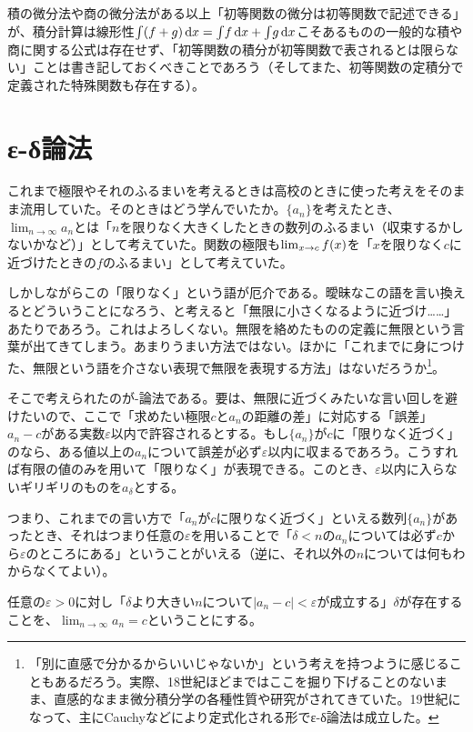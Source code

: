 積の微分法や商の微分法がある以上「初等関数の微分は初等関数で記述できる」が、積分計算は線形性$\int\pare{f+g}\,\dx=\int\!f\,\dx+\int\!g\,\dx$こそあるものの一般的な積や商に関する公式は存在せず、「初等関数の積分が初等関数で表されるとは限らない」ことは書き記しておくべきことであろう（そしてまた、初等関数の定積分で定義された特殊関数も存在する）。

\clearpage
\section{ε-δ論法}
これまで極限やそれのふるまいを考えるときは高校のときに使った考えをそのまま流用していた。そのときはどう学んでいたか。$\{a_n\}$を考えたとき、$\lim_{n\to\infty}a_n$とは「$n$を限りなく大きくしたときの数列のふるまい（収束するかしないかなど）」として考えていた。関数の極限も$\lim_{x\to c}f\pare{x}$を「$x$を限りなく$c$に近づけたときの$f$のふるまい」として考えていた。

しかしながらこの「限りなく」という語が厄介である。曖昧なこの語を言い換えるとどういうことになろう、と考えると「無限に小さくなるように近づけ……」あたりであろう。これはよろしくない。無限を絡めたものの定義に無限という言葉が出てきてしまう。あまりうまい方法ではない。ほかに「これまでに身につけた、無限という語を介さない表現で無限を表現する方法」はないだろうか\footnote{「別に直感で分かるからいいじゃないか」という考えを持つように感じることもあるだろう。実際、18世紀ほどまではここを掘り下げることのないまま、直感的なまま微分積分学の各種性質や研究がされてきていた。19世紀になって、主にCauchyなどにより定式化される形でε-δ論法は成立した。}。

そこで考えられたのが\textit{\varepsilon}-\textit{\delta}論法である。要は、無限に近づくみたいな言い回しを避けたいので、ここで「求めたい極限$c$と$a_n$の距離の差」に対応する「誤差」$a_n-c$がある実数$\varepsilon$以内で許容されるとする。もし$\{a_n\}$が$c$に「限りなく近づく」のなら、ある値以上の$a_n$について誤差が必ず$\varepsilon$以内に収まるであろう。こうすれば有限の値のみを用いて「限りなく」が表現できる。このとき、$\varepsilon$以内に入らないギリギリのものを$a_\delta$とする。

つまり、これまでの言い方で「$a_n$が$c$に限りなく近づく」といえる数列$\{a_n\}$があったとき、それはつまり任意の$\varepsilon$を用いることで「$\delta<n$の$a_n$については必ず$c$から$\varepsilon$のところにある」ということがいえる（逆に、それ以外の$n$については何もわからなくてよい）。

\begin{defi}
    任意の$\varepsilon\!>\!0$に対し「$\delta$より大きい$n$について$|a_n-c|\!<\!\varepsilon$が成立する」$\delta$が存在することを、$\lim_{n\to\infty}a_n=c$ということにする。
\end{defi}

